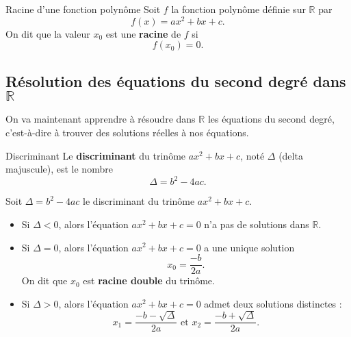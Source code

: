 \documentclass[11pt]{article}
\begin{document}
\begin{defi}{Racine d'une fonction polynôme}
  Soit $f$ la fonction polynôme définie sur $\mathbb{R}$ par
  \[
    f(x) = ax^2+bx+c.
  \]
  On dit que la valeur $x_0$ est une \textbf{racine} de $f$ si
  \[
    f(x_0) = 0.
  \]
\end{defi}

\subsection{Résolution des équations du second degré dans $\mathbb{R}$}

On va maintenant apprendre à résoudre dans $\mathbb{R}$ les équations du second
degré, c'est-à-dire à trouver des solutions réelles à nos équations.

\begin{defi}{Discriminant}
  Le \textbf{discriminant} du trinôme $ax^2+bx+c$, noté $\Delta$ (delta
  majuscule), est le nombre
  \[
    \Delta = b^2-4ac.
  \]
\end{defi}

\begin{prop}
  Soit $\Delta=b^2-4ac$ le discriminant du trinôme $ax^2+bx+c$.
  \begin{itemize}
    \item Si $\Delta<0$, alors l'équation $ax^2+bx+c=0$ n'a pas de solutions
      dans $\mathbb{R}$.
    \item Si $\Delta=0$, alors l'équation $ax^2+bx+c=0$ a une unique solution
      \[x_0 = \frac{-b}{2a}.\] On dit que $x_0$ est \textbf{racine double} du trinôme.
    \item Si $\Delta>0$, alors l'équation $ax^2+bx+c=0$ admet deux solutions
      distinctes : 
      \[
        x_1=\frac{-b-\sqrt\Delta}{2a}
        \text{ et }
        x_2=\frac{-b+\sqrt\Delta}{2a}.
      \]
  \end{itemize}
\end{prop}
\end{document}

